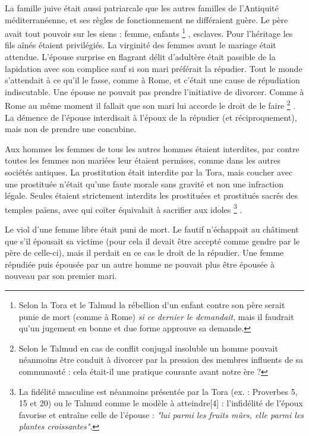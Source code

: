  



 La famille juive était aussi patriarcale que les autres familles de l'Antiquité méditerranéenne, et ses règles de fonctionnement ne différaient guère. Le père avait tout pouvoir sur les siens : femme, enfants%
\footnote{Selon la Tora et le Talmud la rébellion d'un enfant contre son père serait punie de mort (comme à Rome) \emph{si ce dernier le demandait}, mais il faudrait qu'un jugement en bonne et due forme approuve sa demande.}%
, esclaves. Pour l'héritage les fils aînés étaient privilégiés. La virginité des femmes avant le mariage était attendue. L'épouse surprise en flagrant délit d'adultère était passible de la lapidation avec son complice sauf si son mari préférait la répudier. Tout le monde s'attendait à ce qu'il le fasse, comme à Rome, et c'était une cause de répudiation indiscutable. Une épouse ne pouvait pas prendre l'initiative de divorcer. Comme à Rome au même moment il fallait que son mari lui accorde le droit de le faire%
\footnote{Selon le Talmud en cas de conflit conjugal insoluble un homme pouvait néanmoins être conduit à divorcer par la pression des membres influents de sa communauté : cela était-il une pratique courante avant notre ère ?}%
. La démence de l'épouse interdisait à l'époux de la répudier (et réciproquement), mais non de prendre une concubine. 

 Aux hommes les femmes de tous les autres hommes étaient interdites, par contre toutes les femmes non mariées leur étaient permises, comme dans les autres sociétés antiques. La prostitution était interdite par la Tora, mais coucher avec une prostituée n'était qu'une faute morale sans gravité et non une infraction légale. Seules étaient strictement interdits les prostituées et prostitués sacrés des temples païens, avec qui coïter équivalait à sacrifier aux idoles%
\footnote{La fidélité masculine est néanmoins présentée par la Tora (ex. : Proverbes 5, 15 et 20) ou le Talmud comme le modèle à atteindre[4] : l'infidélité de l'époux favorise et entraîne celle de l'épouse : \emph{"lui parmi les fruits mûrs, elle parmi les plantes croissantes"}.}%
. 

 Le viol d'une femme libre était puni de mort. Le fautif n'échappait au châtiment que s'il épousait sa victime (pour cela il devait être accepté comme gendre par le père de celle-ci), mais il perdait en ce cas le droit de la répudier. Une femme répudiée puis épousée par un autre homme ne pouvait plus être épousée à nouveau par son premier mari. 

